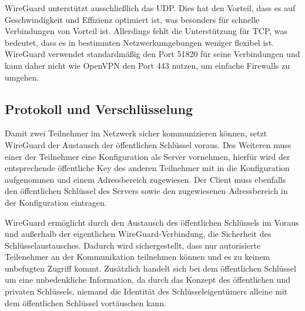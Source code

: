 WireGuard unterstützt ausschließlich das \gls{UDP}. Dies hat den Vorteil, dass es auf Geschwindigkeit und Effizienz optimiert ist, was besonders für schnelle Verbindungen von Vorteil ist. Allerdings fehlt die Unterstützung für \gls{TCP}, was bedeutet, dass es in bestimmten Netzwerkumgebungen weniger flexibel ist. WireGuard verwendet standardmäßig den Port 51820 für seine Verbindungen und kann daher nicht wie OpenVPN den Port 443 nutzen, um einfache Firewalls zu umgehen. \cite{Wireguard_Whitepaper}

\subsection{Protokoll und Verschlüsselung}

Damit zwei Teilnehmer im Netzwerk sicher kommunizieren können, setzt WireGuard der Austausch der öffentlichen Schlüssel voraus. Des Weiteren muss einer der Teilnehmer eine Konfiguration als Server vornehmen, hierfür wird der entsprechende öffentliche Key des anderen Teilnehmer mit in die Konfiguration aufgenommen und einem Adressbereich zugewiesen. Der Client muss ebenfalls den öffentlichen Schlüssel des Servers sowie den zugewiesenen Adressbereich in der Konfiguration eintragen. \cite{Wireguard_Whitepaper}

WireGuard ermöglicht durch den Austausch des öffentlichen Schlüssels im Voraus und außerhalb der eigentlichen WireGuard-Verbindung, die Sicherheit des Schlüsselaustausches. Dadurch wird sichergestellt, dass nur autorisierte Teilenehmer an der Kommunikation teilnehmen können und es zu keinem unbefugten Zugriff kommt. Zusätzlich handelt sich bei dem öffentlichen Schlüssel um eine unbedenkliche Information, da durch das Konzept des öffentlichen und privaten Schlüssels, niemand die Identität des Schlüsseleigentümers alleine mit dem öffentlichen Schlüssel vortäuschen kann.

